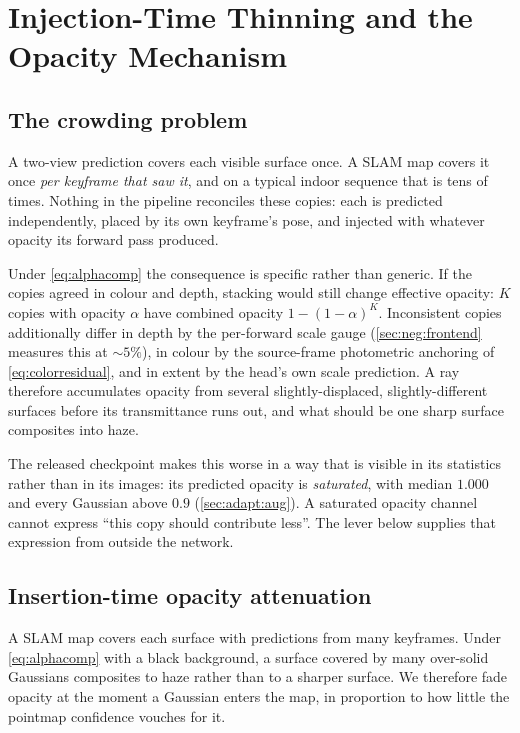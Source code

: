 \chapter{Injection-Time Thinning and the Opacity Mechanism}
\label{ch:thin}

\section{The crowding problem}
\label{sec:thin:crowding}

A two-view prediction covers each visible surface once. A SLAM map covers it
once \emph{per keyframe that saw it}, and on a typical indoor sequence that is
tens of times. Nothing in the pipeline reconciles these copies: each is
predicted independently, placed by its own keyframe's pose, and injected with
whatever opacity its forward pass produced.

Under \cref{eq:alphacomp} the consequence is specific rather than generic. If
the copies agreed in colour and depth, stacking would still change effective
opacity: $K$ copies with opacity $\alpha$ have combined opacity
$1-(1-\alpha)^K$. Inconsistent copies additionally differ in depth by the per-forward scale gauge
(\cref{sec:neg:frontend} measures this at ${\sim}5\%$), in colour by the
source-frame photometric anchoring of \cref{eq:colorresidual}, and in extent by
the head's own scale prediction. A ray therefore accumulates opacity from
several slightly-displaced, slightly-different surfaces before its
transmittance runs out, and what should be one sharp surface composites into
haze.

The released checkpoint makes this worse in a way that is visible in its
statistics rather than in its images: its predicted opacity is
\emph{saturated}, with median $1.000$ and every Gaussian above $0.9$
(\cref{sec:adapt:aug}). A saturated opacity channel cannot express ``this
copy should contribute less''. The lever below supplies that expression from
outside the network.

\section{Insertion-time opacity attenuation}
\label{sec:thin:lever}
\label{sec:method:thin}

A SLAM map covers each surface with predictions from many keyframes. Under
\cref{eq:alphacomp} with a black background, a surface covered by many
over-solid Gaussians composites to haze rather than to a sharper surface. We
therefore fade opacity at the moment a Gaussian enters the map, in proportion
to how little the pointmap confidence vouches for it.

